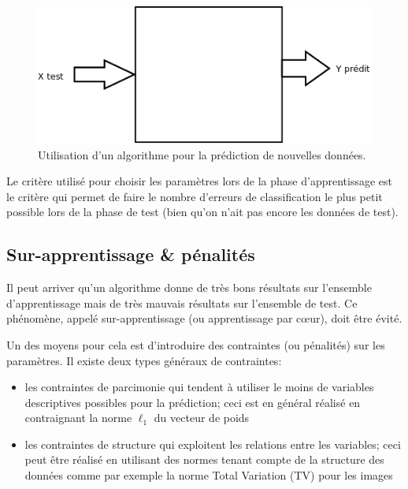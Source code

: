 \begin{figure}[h]
 		\centering
 		\includegraphics[scale = 0.25]{images/App_Mach_Prediction}
 		\caption{Utilisation d'un algorithme pour la prédiction de nouvelles données.}
 		\label{fig:Apprentissage_Machine_Prediction}
\end{figure}

Le critère utilisé pour choisir les paramètres lors de la phase d'apprentissage est le critère qui permet de faire le nombre d'erreurs de classification
le plus petit possible lors de la phase de test (bien qu'on n'ait pas encore les données de test).

\subsection{Sur-apprentissage \& pénalités}

Il peut arriver qu'un algorithme donne de très bons résultats sur l'ensemble d'apprentissage mais de très mauvais résultats sur l'ensemble de test.
Ce phénomène, appelé sur-apprentissage (ou apprentissage par cœur), doit être évité.

Un des moyens pour cela est d'introduire des contraintes (ou pénalités) sur les paramètres.
Il existe deux types généraux de contraintes:
\begin{itemize}
 \item les contraintes de parcimonie qui tendent à utiliser le moins de variables descriptives possibles pour la prédiction; ceci est en général réalisé en contraignant la norme $\ell_1$ du vecteur de poids
 \item les contraintes de structure qui exploitent les relations entre les variables; ceci peut être réalisé en utilisant des normes tenant compte de la structure des données comme par exemple la norme Total Variation (TV) pour les images
\end{itemize}
